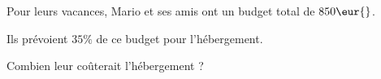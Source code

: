 \begin{exo}{}
	Pour leurs vacances, Mario et ses amis ont un budget total de $850\eur{}$.

	Ils prévoient $35\%$ de ce budget pour l'hébergement.


	Combien leur coûterait l'hébergement ?
\end{exo}
